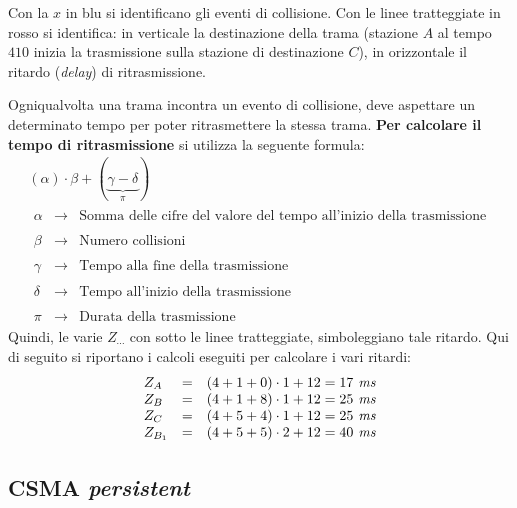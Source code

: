 \documentclass[a4paper]{article}
\begin{document}
	\noindent
	Con la $x$ in blu si identificano gli eventi di collisione. Con le linee tratteggiate in rosso si identifica: in verticale la destinazione della trama (stazione $A$ al tempo $410$ inizia la trasmissione sulla stazione di destinazione $C$), in orizzontale il ritardo (\emph{delay}) di ritrasmissione.\newpage
	
	\noindent
	Ogniqualvolta una trama incontra un evento di collisione, deve aspettare un determinato tempo per poter ritrasmettere la stessa trama. \textbf{Per calcolare il tempo di ritrasmissione} si utilizza la seguente formula:
	\begin{gather*}
		\left(\alpha\right) \cdot \beta + (\underbrace{\gamma - \delta}_{\pi}) \\
		\begin{array}{lll}
			\alpha 	& \longrightarrow & \text{Somma delle cifre del valore del tempo all'inizio della trasmissione} \\
			&& \\
			\beta 	& \longrightarrow & \text{Numero collisioni} \\
			&& \\
			\gamma 	& \longrightarrow & \text{Tempo alla fine della trasmissione} \\
			&& \\
			\delta  & \longrightarrow & \text{Tempo all'inizio della trasmissione} \\
			&& \\
			\pi     & \longrightarrow & \text{Durata della trasmissione}
		\end{array}
	\end{gather*}
	Quindi, le varie $Z_{\cdots}$ con sotto le linee tratteggiate, simboleggiano tale ritardo. Qui di seguito si riportano i calcoli eseguiti per calcolare i vari ritardi:
	\begin{equation*}
		\begin{array}{lll}
			Z_{A}		& = & \left(4+1+0\right) \cdot 1 + 12 = 17 \emph{ ms} \\
			Z_{B}		& = & \left(4+1+8\right) \cdot 1 + 12 = 25 \emph{ ms} \\
			Z_{C}		& = & \left(4+5+4\right) \cdot 1 + 12 = 25 \emph{ ms} \\
			Z_{B_{1}}	& = & \left(4+5+5\right) \cdot 2 + 12 = 40 \emph{ ms}
		\end{array}
	\end{equation*}\newpage

	\subsection{\textcolor{Red3}{CSMA \emph{persistent}}}
	
\end{document}
